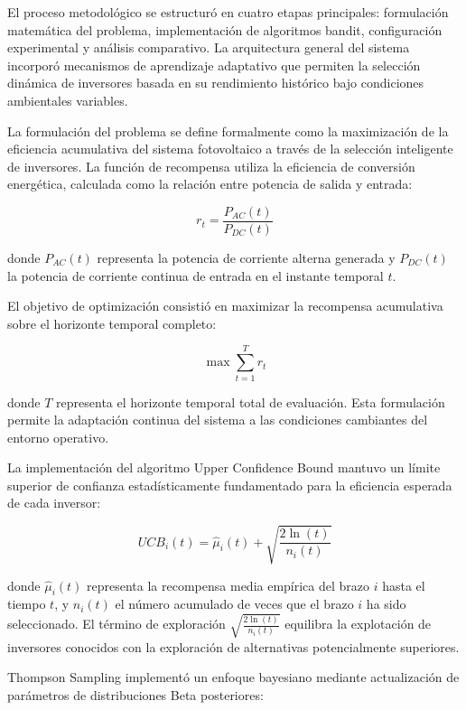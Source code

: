 \documentclass[conference]{IEEEtran}
\begin{document}
El proceso metodológico se estructuró en cuatro etapas principales: formulación matemática del problema, implementación de algoritmos bandit, configuración experimental y análisis comparativo. La arquitectura general del sistema incorporó mecanismos de aprendizaje adaptativo que permiten la selección dinámica de inversores basada en su rendimiento histórico bajo condiciones ambientales variables.

La formulación del problema se define formalmente como la maximización de la eficiencia acumulativa del sistema fotovoltaico a través de la selección inteligente de inversores. La función de recompensa utiliza la eficiencia de conversión energética, calculada como la relación entre potencia de salida y entrada:

\begin{equation}
r_t = \frac{P_{AC}(t)}{P_{DC}(t)}
\end{equation}

donde $P_{AC}(t)$ representa la potencia de corriente alterna generada y $P_{DC}(t)$ la potencia de corriente continua de entrada en el instante temporal $t$.

El objetivo de optimización consistió en maximizar la recompensa acumulativa sobre el horizonte temporal completo:

\begin{equation}
\max \sum_{t=1}^{T} r_t
\end{equation}

donde $T$ representa el horizonte temporal total de evaluación. Esta formulación permite la adaptación continua del sistema a las condiciones cambiantes del entorno operativo.

La implementación del algoritmo Upper Confidence Bound mantuvo un límite superior de confianza estadísticamente fundamentado para la eficiencia esperada de cada inversor:

\begin{equation}
UCB_i(t) = \hat{\mu}_i(t) + \sqrt{\frac{2 \ln(t)}{n_i(t)}}
\end{equation}

donde $\hat{\mu}_i(t)$ representa la recompensa media empírica del brazo $i$ hasta el tiempo $t$, y $n_i(t)$ el número acumulado de veces que el brazo $i$ ha sido seleccionado. El término de exploración $\sqrt{\frac{2 \ln(t)}{n_i(t)}}$ equilibra la explotación de inversores conocidos con la exploración de alternativas potencialmente superiores.

Thompson Sampling implementó un enfoque bayesiano mediante actualización de parámetros de distribuciones Beta posteriores:
\end{document}

